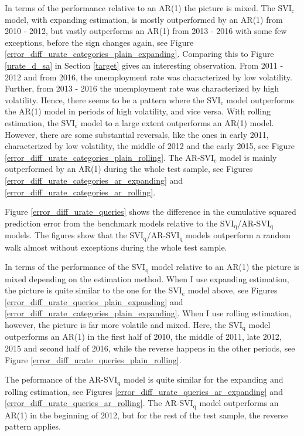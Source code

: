In terms of the performance relative to an AR(1) the picture is mixed. The SVI$_\text{c}$ model, with expanding estimation, is mostly outperformed by an AR(1) from 2010 - 2012, but vastly outperforms an AR(1) from 2013 - 2016 with some few exceptions, before the sign changes again, see Figure \ref{error_diff_urate_categories_plain_expanding}. Comparing this to Figure \ref{urate_d_sa} in Section \ref{target} gives an interesting observation. From 2011 - 2012 and from 2016, the unemployment rate was characterized by low volatility. Further, from 2013 - 2016 the unemployment rate was characterized by high volatility. Hence, there seems to be a pattern where the SVI$_\text{c}$ model outperforms the AR(1) model in periods of high volatility, and vice versa. With rolling estimation, the SVI$_\text{c}$ model to a large extent outperforms an AR(1) model. However, there are some substantial reversals, like the ones in early 2011, characterized by low volatility, the middle of 2012 and the early 2015, see Figure \ref{error_diff_urate_categories_plain_rolling}. The AR-SVI$_\text{c}$ model is mainly outperformed by an AR(1) during the whole test sample, see Figures \ref{error_diff_urate_categories_ar_expanding} and \ref{error_diff_urate_categories_ar_rolling}.

Figure \ref{error_diff_urate_queries} shows the difference in the cumulative squared prediction error from the benchmark models relative to the SVI$_\text{q}$/AR-SVI$_\text{q}$ models. The figures show that the SVI$_\text{q}$/AR-SVI$_\text{q}$ models outperform a random walk almost without exceptions during the whole test sample.

In terms of the performance of the SVI$_\text{q}$ model relative to an AR(1) the picture is mixed depending on the estimation method. When I use expanding estimation, the picture is quite similar to the one for the SVI$_\text{c}$ model above, see Figures \ref{error_diff_urate_queries_plain_expanding} and \ref{error_diff_urate_categories_plain_expanding}. When I use rolling estimation, however, the picture is far more volatile and mixed. Here, the SVI$_\text{q}$ model outperforms an AR(1) in the first half of 2010, the middle of 2011, late 2012, 2015 and second half of 2016, while the reverse happens in the other periods, see Figure \ref{error_diff_urate_queries_plain_rolling}.

The peformance of the AR-SVI$_\text{q}$ model is quite similar for the expanding and rolling estimation, see Figures \ref{error_diff_urate_queries_ar_expanding} and \ref{error_diff_urate_queries_ar_rolling}. The AR-SVI$_\text{q}$ model outperforms an AR(1) in the beginning of 2012, but for the rest of the test sample, the reverse pattern applies. \clearpage

